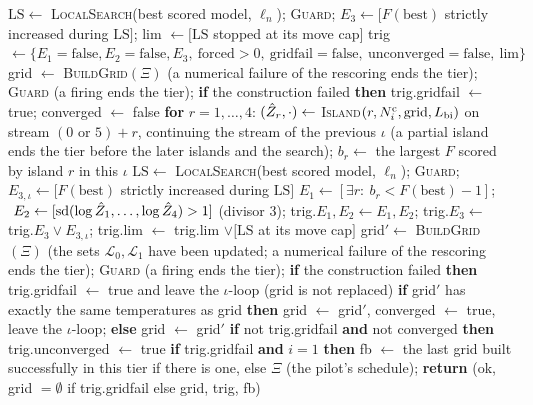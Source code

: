 \begin{algorithm}
{\begin{algorithmic}[1]
\State $\mathrm{LS}\gets$ \textsc{LocalSearch}(best scored model, $\ell_n$); \textsc{Guard}; $E_3\gets[F(\text{best})$ strictly increased during $\mathrm{LS}]$; lim $\gets[\mathrm{LS}$ stopped at its move cap$]$ %
\State trig $\gets\{E_1{=}\text{false},E_2{=}\text{false},E_3,\ \text{forced}>0,\ \text{gridfail}{=}\text{false},\ \text{unconverged}{=}\text{false},\ \text{lim}\}$ %
\State grid $\gets$ \textsc{BuildGrid}$(\Xi)$ (a numerical failure of the rescoring ends the tier); \textsc{Guard} (a firing ends the tier); \textbf{if} the construction failed \textbf{then} trig.gridfail $\gets$ true; converged $\gets$ false %
\State \textbf{for} $r=1,\dots,4$: $(\hat Z_r,\cdot)\gets$ \textsc{Island}$(r,N^{\mathrm c}_i,\text{grid},L_{\mathrm{bi}})$ on stream $(0\text{ or }5)+r$, continuing the stream of the previous $\iota$ (a partial island ends the tier before the later islands and the search); $b_r\gets$ the largest $F$ scored by island $r$ in this $\iota$ %
\State $\mathrm{LS}\gets$ \textsc{LocalSearch}(best scored model, $\ell_n$); \textsc{Guard}; $E_{3,\iota}\gets[F(\text{best})$ strictly increased during $\mathrm{LS}]$ %
\State $E_1\gets[\exists r:\ b_r<F(\text{best})-1]$; $\ E_2\gets[\mathrm{sd}(\log\Zhat_1,\dots,\log\Zhat_4)>1]$ (divisor $3$); trig.$E_1,E_2\gets E_1,E_2$; trig.$E_3\gets$ trig.$E_3\vee E_{3,\iota}$; trig.lim $\gets$ trig.lim $\vee[\mathrm{LS}$ at its move cap$]$ %
\State grid$'\gets$ \textsc{BuildGrid}$(\Xi)$ (the sets $\mathcal L_0,\mathcal L_1$ have been updated; a numerical failure of the rescoring ends the tier); \textsc{Guard} (a firing ends the tier); \textbf{if} the construction failed \textbf{then} trig.gridfail $\gets$ true and leave the $\iota$-loop (grid is not replaced) %
\State \textbf{if} grid$'$ has exactly the same temperatures as grid \textbf{then} grid $\gets$ grid$'$, converged $\gets$ true, leave the $\iota$-loop; \textbf{else} grid $\gets$ grid$'$ %
\EndFor
\State \textbf{if} not trig.gridfail \textbf{and} not converged \textbf{then} trig.unconverged $\gets$ true %
\EndIf
\State \textbf{if} trig.gridfail \textbf{and} $i=1$ \textbf{then} fb $\gets$ the last grid built successfully in this tier if there is one, else $\Xi$ (the pilot's schedule); \textbf{return} (ok, grid $=\emptyset$ if trig.gridfail else grid, trig, fb) %

\end{algorithmic}}
\end{algorithm}
